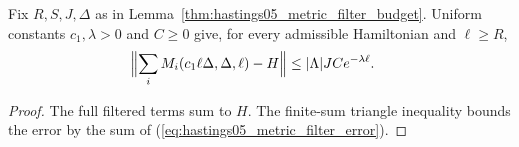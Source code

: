 \begin{theorem}
    \label{thm:hastings05_metric_filter_sum}
    \leanok
    Fix $R,S,J,\Delta$ as in
    Lemma~\ref{thm:hastings05_metric_filter_budget}. Uniform constants
    $c_1,\lambda>0$ and $C\ge0$ give, for every admissible Hamiltonian and
    $\ell\ge R$,
    \begin{align}
        \Bigl\|\sum_iM_i(c_1\ell\Delta,\Delta,\ell)-H\Bigr\|
         & \le|\Lambda|JC e^{-\lambda\ell}.
        \label{eq:hastings05_metric_filter_sum}
    \end{align}
\end{theorem}
\begin{proof}\leanok
    The full filtered terms sum to $H$. The finite-sum triangle
    inequality bounds the error by the sum of
    (\ref{eq:hastings05_metric_filter_error}).
\end{proof}

